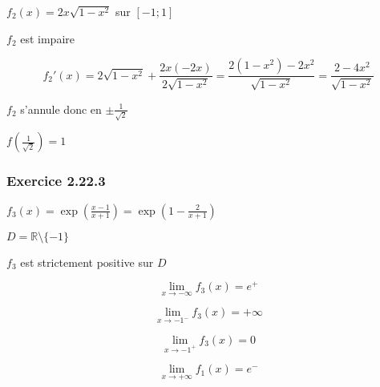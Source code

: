 \documentclass{report}
\begin{document}
$f_2(x) = 2x\sqrt{1-x^2}$ sur $[-1 ; 1]$

$f_2$ est impaire

\begin{displaymath}
	f_2'(x) = 2\sqrt{1-x^2} + \frac{2x(-2x)}{2\sqrt{1-x^2}} 
	        = \frac{2(1-x^2)-2x^2}{\sqrt{1-x^2}}
	        = \frac{2-4x^2}{\sqrt{1-x^2}}
\end{displaymath}

$f_2$ s'annule donc en $\pm \frac{1}{\sqrt{2}}$

$f\left( \frac{1}{\sqrt{2}} \right) = 1$
	


\subsubsection*{Exercice 2.22.3}

$f_3(x) = \exp\left( \frac{x-1}{x+1}\right) = \exp\left(1- \frac{2}{x+1}\right)$

$D = \mathbb{R} \setminus \{-1\}$

$f_3$ est strictement positive sur $D$

\begin{displaymath}
	\lim_{x \rightarrow -\infty} f_3(x) = e^{+}
\end{displaymath}

\begin{displaymath}
	\lim_{x \rightarrow -1^{-}} f_3(x) = +\infty
\end{displaymath}

\begin{displaymath}
	\lim_{x \rightarrow -1^{+}} f_3(x) = 0
\end{displaymath}

\begin{displaymath}
	\lim_{x \rightarrow +\infty} f_1(x) = e^{-}
\end{displaymath}
\end{document}
